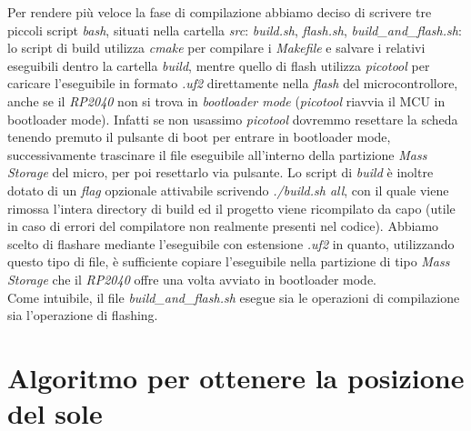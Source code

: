 \noindent Per rendere più veloce la fase di compilazione abbiamo deciso di
scrivere tre piccoli script \emph{bash}, situati nella cartella
\emph{src}: \emph{build.sh}, \emph{flash.sh},
\emph{build\_and\_flash.sh}: lo script di build utilizza \emph{cmake}
per compilare i \emph{Makefile} e salvare i relativi eseguibili dentro
la cartella \emph{build}, mentre quello di flash utilizza
\emph{picotool} per caricare l'eseguibile in formato \emph{.uf2}
direttamente nella \emph{flash} del microcontrollore, anche se il \textit{RP2040}
non si trova in \textit{bootloader mode} (\emph{picotool} riavvia il MCU in
bootloader mode). Infatti se non usassimo \emph{picotool} dovremmo
resettare la scheda tenendo premuto il pulsante di boot per entrare in
bootloader mode, successivamente trascinare il file eseguibile
all'interno della partizione \textit{Mass Storage} del micro, per poi resettarlo
via pulsante. Lo script di \emph{build} è inoltre dotato di un
\emph{flag} opzionale attivabile scrivendo \emph{./build.sh all}, con il
quale viene rimossa l'intera directory di build ed il progetto viene
ricompilato da capo (utile in caso di errori del compilatore non
realmente presenti nel codice). Abbiamo scelto di flashare mediante
l'eseguibile con estensione \emph{.uf2} in quanto, utilizzando questo
tipo di file, è sufficiente copiare l'eseguibile nella partizione di
tipo \textit{Mass Storage} che il \textit{RP2040} offre una volta avviato in bootloader
mode.\\
Come intuibile, il file \emph{build\_and\_flash.sh} esegue sia le
operazioni di compilazione sia l'operazione di flashing.

\hypertarget{algoritmo-per-ottenere-la-posizione-del-sole}{%
\section{Algoritmo per ottenere la posizione del
sole}\label{algoritmo-per-ottenere-la-posizione-del-sole}}

